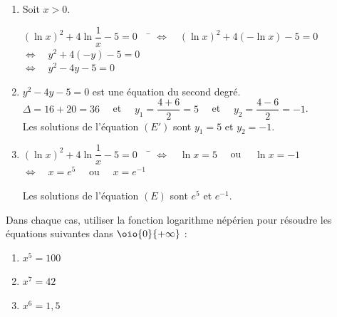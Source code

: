 \documentclass[a4paper,11pt,exos]{nsi} %
\begin{document}
\textcolor{UGLiBlue}{
    \begin{enumerate}
        \item Soit $x>0$.
        \begin{tabbing}
            $\left(\ln x\right)^2+4\ln \dfrac{1}{x}-5=0\quad$ \= $\iff \quad \left(\ln x\right)^2+4(-\ln x)-5=0$\\
            \> $\iff \quad y^2+4(-y)-5=0$\\
            \> $\iff \quad y^2-4y-5=0$
        \end{tabbing}
        \item $y^2-4y-5=0$ est une équation du second degré.\\[.5em]
        $\Delta=16+20=36\quad$ et $\quad y_1=\dfrac{4+6}{2}=5\quad$ et $\quad y_2=\dfrac{4-6}{2}=-1$.\\[.5em]
        Les solutions de l'équation $(E')$ sont $y_1=5$ et $y_2=-1$.
        \item \begin{tabbing}
            $\left(\ln x\right)^2+4\ln \dfrac{1}{x}-5=0\quad$ \= $\iff\quad \ln x=5\quad$ ou $\quad \ln x=-1$\\
            \>$\iff \quad x=e^5\quad$ ou $\quad x=e^{-1}$
        \end{tabbing}
        Les solutions de l'équation $(E)$ sont $e^5$ et $e^{-1}$.
    \end{enumerate}
}

\exo{}
Dans chaque cas, utiliser la fonction logarithme népérien pour résoudre les équations suivantes dans $\oio{0}{+\infty}$ :
\begin{multicols}{3}
    \begin{enumerate}
        \item $x^5=100$
        \item $x^7=42$
        \item $x^6=1,5$
    \end{enumerate}
\end{multicols}
\end{document}
